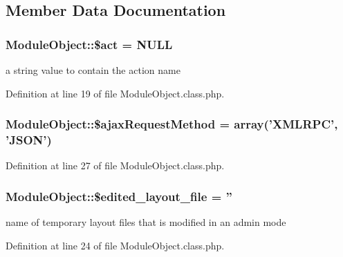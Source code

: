 \subsection{Member Data Documentation}
\hypertarget{classModuleObject_a9d43905d072c53cd5cd239d706215895}{
\subsubsection[{\$act}]{\setlength{\rightskip}{0pt plus 5cm}Module\-Object\-::\$act = N\-U\-L\-L}}\label{classModuleObject_a9d43905d072c53cd5cd239d706215895}


a string value to contain the action name 



Definition at line 19 of file Module\-Object.\-class.\-php.

\hypertarget{classModuleObject_a783d38cb68310dc6e5a1f6c1cc6c6b84}{
\subsubsection[{\$ajax\-Request\-Method}]{\setlength{\rightskip}{0pt plus 5cm}Module\-Object\-::\$ajax\-Request\-Method = array('X\-M\-L\-R\-P\-C', 'J\-S\-O\-N')}}\label{classModuleObject_a783d38cb68310dc6e5a1f6c1cc6c6b84}


Definition at line 27 of file Module\-Object.\-class.\-php.

\hypertarget{classModuleObject_a1fcbb01c627ce5ff104c05f54715bd61}{
\subsubsection[{\$edited\-\_\-layout\-\_\-file}]{\setlength{\rightskip}{0pt plus 5cm}Module\-Object\-::\$edited\-\_\-layout\-\_\-file = ''}}\label{classModuleObject_a1fcbb01c627ce5ff104c05f54715bd61}


name of temporary layout files that is modified in an admin mode 



Definition at line 24 of file Module\-Object.\-class.\-php.

